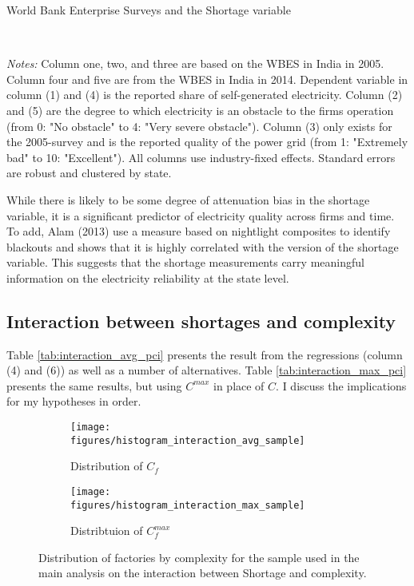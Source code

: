 \documentclass[11pt]{article}
\begin{document}
\begin{table}
    \caption{World Bank Enterprise Surveys and the Shortage variable}
    \label{tab:wbes}
    \begin{minipage}{0.95\textwidth} 

    \\
    { \footnotesize \textit{Notes:} Column one, two, and three are based on the WBES in India in 2005. Column four and five are from the WBES in India in 2014. Dependent variable in column (1) and (4) is the reported share of self-generated electricity. Column (2) and (5) are the degree to which electricity is an obstacle to the firms operation (from 0: "No obstacle" to 4: "Very severe obstacle"). Column (3) only exists for the 2005-survey and is the reported quality of the power grid (from 1: "Extremely bad" to 10: "Excellent"). All columns use industry-fixed effects. Standard errors are robust and clustered by state. \\
\par}
    \end{minipage}
\end{table}   

While there is likely to be some degree of attenuation bias in the shortage variable, it is a significant predictor of electricity quality across firms and time. To add, Alam (2013) use a measure based on nightlight composites to identify blackouts and shows that it is highly correlated with the version of the shortage variable. This suggests that the shortage measurements carry meaningful information on the electricity reliability at the state level.



\subsection{Interaction between shortages and complexity}%
\label{sub:regressions}

Table \ref{tab:interaction_avg_pci} presents the result from the regressions (column (4) and (6)) as well as a number of alternatives. Table \ref{tab:interaction_max_pci} presents the same results, but using $C^{max}$ in place of $C$. I discuss the implications for my hypotheses in order.

\begin{figure}
     \centering
     \begin{subfigure}[b]{0.45\textwidth}
         \centering
         \texttt{[image: figures/histogram\_interaction\_avg\_sample]}
	 \caption{Distribution of $C_f$}
         \label{fig:interaction_sample_avg}
     \end{subfigure}
     \hfill
     \begin{subfigure}[b]{0.45\textwidth}
         \centering
         \texttt{[image: figures/histogram\_interaction\_max\_sample]}
	 \caption{Distribtuion of $C^{max}_{f}$}
         \label{fig:interaction_sample_max}
     \end{subfigure}
     \caption{Distribution of factories by complexity for the sample used in the main analysis on the interaction between Shortage and complexity.}
        \label{fig:interaction_sample}
\end{figure}
\end{document}
